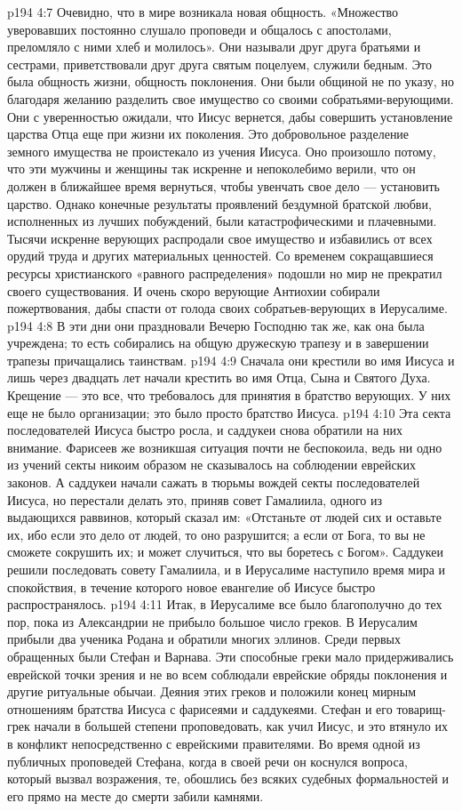 \vs p194 4:7 Очевидно, что в мире возникала новая общность. «Множество уверовавших постоянно слушало проповеди и общалось с апостолами, преломляло с ними хлеб и молилось». Они называли друг друга братьями и сестрами, приветствовали друг друга святым поцелуем, служили бедным. Это была общность жизни, общность поклонения. Они были общиной не по указу, но благодаря желанию разделить свое имущество со своими собратьями\hyp{}верующими. Они с уверенностью ожидали, что Иисус вернется, дабы совершить установление царства Отца еще при жизни их поколения. Это добровольное разделение земного имущества не проистекало из учения Иисуса. Оно произошло потому, что эти мужчины и женщины так искренне и непоколебимо верили, что он должен в ближайшее время вернуться, чтобы увенчать свое дело --- установить царство. Однако конечные результаты проявлений бездумной братской любви, исполненных из лучших побуждений, были катастрофическими и плачевными. Тысячи искренне верующих распродали свое имущество и избавились от всех орудий труда и других материальных ценностей. Со временем сокращавшиеся ресурсы христианского «равного распределения» подошли  но мир не прекратил своего существования. И очень скоро верующие Антиохии собирали пожертвования, дабы спасти от голода своих собратьев\hyp{}верующих в Иерусалиме.
\vs p194 4:8 \pc В эти дни они праздновали Вечерю Господню так же, как она была учреждена; то есть собирались на общую дружескую трапезу и в завершении трапезы причащались таинствам.
\vs p194 4:9 \pc Сначала они крестили во имя Иисуса и лишь через двадцать лет начали крестить во имя Отца, Сына и Святого Духа. Крещение --- это все, что требовалось для принятия в братство верующих. У них еще не было организации; это было просто братство Иисуса.
\vs p194 4:10 \pc Эта секта последователей Иисуса быстро росла, и саддукеи снова обратили на них внимание. Фарисеев же возникшая ситуация почти не беспокоила, ведь ни одно из учений секты никоим образом не сказывалось на соблюдении еврейских законов. А саддукеи начали сажать в тюрьмы вождей секты последователей Иисуса, но перестали делать это, приняв совет Гамалиила, одного из выдающихся раввинов, который сказал им: «Отстаньте от людей сих и оставьте их, ибо если это дело от людей, то оно разрушится; а если от Бога, то вы не сможете сокрушить их; и может случиться, что вы боретесь с Богом». Саддукеи решили последовать совету Гамалиила, и в Иерусалиме наступило время мира и спокойствия, в течение которого новое евангелие об Иисусе быстро распространялось.
\vs p194 4:11 Итак, в Иерусалиме все было благополучно до тех пор, пока из Александрии не прибыло большое число греков. В Иерусалим прибыли два ученика Родана и обратили многих эллинов. Среди первых обращенных были Стефан и Варнава. Эти способные греки мало придерживались еврейской точки зрения и не во всем соблюдали еврейские обряды поклонения и другие ритуальные обычаи. Деяния этих греков и положили конец мирным отношениям братства Иисуса с фарисеями и саддукеями. Стефан и его товарищ\hyp{}грек начали в большей степени проповедовать, как учил Иисус, и это втянуло их в конфликт непосредственно с еврейскими правителями. Во время одной из публичных проповедей Стефана, когда в своей речи он коснулся вопроса, который вызвал возражения, те, обошлись без всяких судебных формальностей и его прямо на месте до смерти забили камнями.
